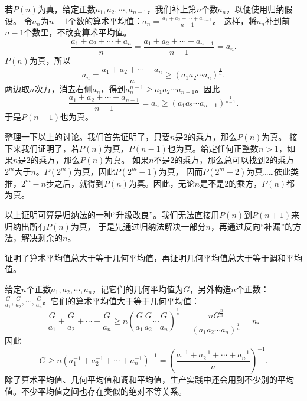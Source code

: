 \documentclass[12pt,UTF8,fontset=none]{ctexbook}
\begin{document}
若$P(n)$为真，给定正数$a_1, a_2, \cdots , a_{n-1}$，我们补上第$n$个数$a_n$，以便使用归纳假设。
令$a_n$为$n-1$个数的算术平均值：$a_n = \frac{a_1 + a_2 + \cdots + a_{n-1}}{n-1}$。
这样，将$a_n$补到前$n-1$个数里，不改变算术平均值。
$$ \frac{a_1 + a_2 + \cdots + a_n}{n} = \frac{a_1 + a_2 + \cdots + a_{n-1}}{n-1} = a_n. $$
$P(n)$为真，所以
$$ a_n = \frac{a_1 + a_2 + \cdots + a_n}{n} \geqslant (a_1a_2\cdots a_{n})^{\frac{1}{n}}. $$
两边取$n$次方，消去右侧$a_n$，得到$a_n^{n-1} \geqslant a_1a_2\cdots a_{n-1}$。因此
$$   \frac{a_1 + a_2 + \cdots + a_{n-1}}{n-1} = a_n \geqslant (a_1a_2\cdots a_{n-1})^{\frac{1}{n-1}}. $$
于是$P(n-1)$也为真。

整理一下以上的讨论。我们首先证明了，只要$n$是$2$的乘方，那么$P(n)$为真。
接下来我们证明了，若$P(n)$为真，$P(n-1)$也为真。给定任何正整数$n>1$，如果$n$是$2$的乘方，那么$P(n)$为真。
如果$n$不是$2$的乘方，那么总可以找到$2$的乘方$2^m$大于$n$。$P(2^m)$为真，因此$P(2^m-1)$为真，
因而$P(2^m-2)$为真……依此类推，$2^m-n$步之后，就得到$P(n)$为真。因此，无论$n$是不是$2$的乘方，$P(n)$都为真。

以上证明可算是归纳法的一种“升级改良”。我们无法直接用$P(n)$到$P(n+1)$来归纳出所有$P(n)$为真，
于是先通过归纳法解决一部分$n$，再通过反向“补漏”的方法，解决剩余的$n$。

证明了算术平均值总大于等于几何平均值，再证明几何平均值总大于等于调和平均值。

给定$n$个正数$a_1, a_2, \cdots , a_n$，记它们的几何平均值为$G$，另外构造$n$个正数：
$\frac{G}{a_1}, \frac{G}{a_2}, \cdots , \frac{G}{a_n}$。它们的算术平均值大于等于几何平均值：
$$ \frac{G}{a_1} + \frac{G}{a_2} + \cdots + \frac{G}{a_n} \geqslant n\left(\frac{G}{a_1}\frac{G}{a_2}\cdots \frac{G}{a_n}\right)^{\frac{1}{n}} = \frac{nG^\frac{n}{n}}{(a_1a_2\cdots a_{n})^{\frac{1}{n}}} = n.$$
因此
$$ G \geqslant n \left(a_1^{-1} + a_2^{-1} + \cdots + a_n^{-1}\right)^{-1} =  \left(\frac{a_1^{-1} + a_2^{-1} + \cdots + a_n^{-1}}{n}\right)^{-1}. $$
除了算术平均值、几何平均值和调和平均值，生产实践中还会用到不少别的平均值。不少平均值之间也存在类似的绝对不等关系。

\end{document}
